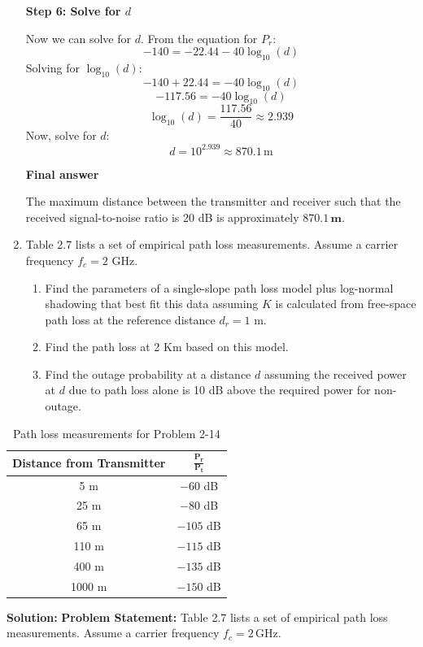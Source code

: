 \documentclass[a4paper,12pt]{book}
\begin{document}
\begin{enumerate}
		\textbf{Step 6: Solve for \( d \)}
		
		Now we can solve for \( d \). From the equation for \( P_r \):
		\[
		-140 = -22.44 - 40 \log_{10}(d)
		\]
		Solving for \( \log_{10}(d) \):
		\[
		-140 + 22.44 = -40 \log_{10}(d)
		\]
		\[
		-117.56 = -40 \log_{10}(d)
		\]
		\[
		\log_{10}(d) = \frac{117.56}{40} \approx 2.939
		\]
		Now, solve for \( d \):
		\[
		d = 10^{2.939} \approx 870.1 \, \text{m}
		\]
		
		\textbf{Final answer}
		
		The maximum distance between the transmitter and receiver such that the received signal-to-noise ratio is 20 dB is approximately \( \mathbf{870.1 \, \text{m}} \).
		
		\item Table 2.7 lists a set of empirical path loss measurements. Assume a carrier frequency $f_c = 2$ GHz.
		
		\begin{enumerate}
			\item Find the parameters of a single-slope path loss model plus log-normal shadowing that best fit this data assuming $K$ is calculated from free-space path loss at the reference distance $d_r = 1$ m.
			
			\item Find the path loss at 2 Km based on this model.
			
			\item Find the outage probability at a distance $d$ assuming the received power at $d$ due to path loss alone is 10 dB above the required power for non-outage.
		\end{enumerate}
	\end{enumerate}
	
	\begin{table}[h!]
		\centering
		\caption{Path loss measurements for Problem 2-14}
		\begin{tabular}{|c|c|}
			\hline
			\textbf{Distance from Transmitter} & $\mathbf{\frac{P_r}{P_t}}$ \\
			\hline
			5 m   & $-60$ dB \\
			25 m  & $-80$ dB \\
			65 m  & $-105$ dB \\
			110 m & $-115$ dB \\
			400 m & $-135$ dB \\
			1000 m & $-150$ dB \\
			\hline
		\end{tabular}
	\end{table}
	\textbf{Solution:} \textbf{Problem Statement:} Table 2.7 lists a set of empirical path loss measurements. Assume a carrier frequency \( f_c = 2 \, \text{GHz} \).
	
\end{document}
